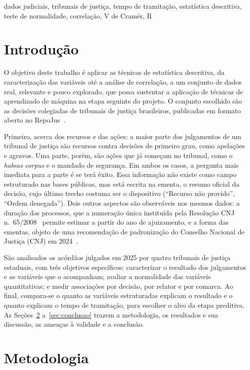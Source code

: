 \documentclass[conference]{IEEEtran}
\begin{document}
\begin{IEEEkeywords}
dados judiciais, tribunais de justiça, tempo de tramitação, estatística descritiva, teste de normalidade, correlação, V de Cramér, R
\end{IEEEkeywords}

\section{Introdução}

O objetivo deste trabalho é aplicar as técnicas de estatística descritiva, da
caracterização das variáveis até a análise de correlação, a um conjunto de
dados real, relevante e pouco explorado, que possa sustentar a aplicação de
técnicas de aprendizado de máquina na etapa seguinte do projeto. O conjunto
escolhido são as decisões colegiadas de tribunais de justiça brasileiros,
publicadas em formato aberto no RepoJus~\cite{repojus}.

Primeiro, acerca dos recursos e das ações: a maior parte dos julgamentos de um
tribunal de justiça são recursos contra decisões de primeiro grau, como
apelações e agravos. Uma parte, porém, são ações que já começam no tribunal,
como o \emph{habeas corpus} e o mandado de segurança. Em ambos os casos, a
pergunta mais imediata para a parte é se terá êxito. Essa informação não existe
como campo estruturado nas bases públicas, mas está escrita na ementa, o resumo
oficial da decisão, cujo último trecho costuma ser o dispositivo (``Recurso não
provido'', ``Ordem denegada''). Dois outros aspectos são observáveis nos mesmos
dados: a duração dos processos, que a numeração única instituída pela Resolução
CNJ n.~65/2008~\cite{cnj65} permite estimar a partir do ano de ajuizamento, e a
forma das ementas, objeto de uma recomendação de padronização do Conselho
Nacional de Justiça (CNJ) em 2024~\cite{cnj154}.

São analisados os acórdãos julgados em 2025 por quatro tribunais de justiça
estaduais, com três objetivos específicos: caracterizar o resultado dos
julgamentos e as variáveis que o acompanham; avaliar a normalidade das
variáveis quantitativas; e medir associações por decisão, por relator e por
comarca. Ao final, compara-se o quanto as variáveis estruturadas explicam o
resultado e o quanto explicam o tempo de tramitação, para escolher o alvo da
etapa preditiva. As Seções~\ref{sec:metodologia} a~\ref{sec:conclusao} trazem
a metodologia, os resultados e sua discussão, as ameaças à validade e a
conclusão.

\section{Metodologia}\label{sec:metodologia}
\end{document}
